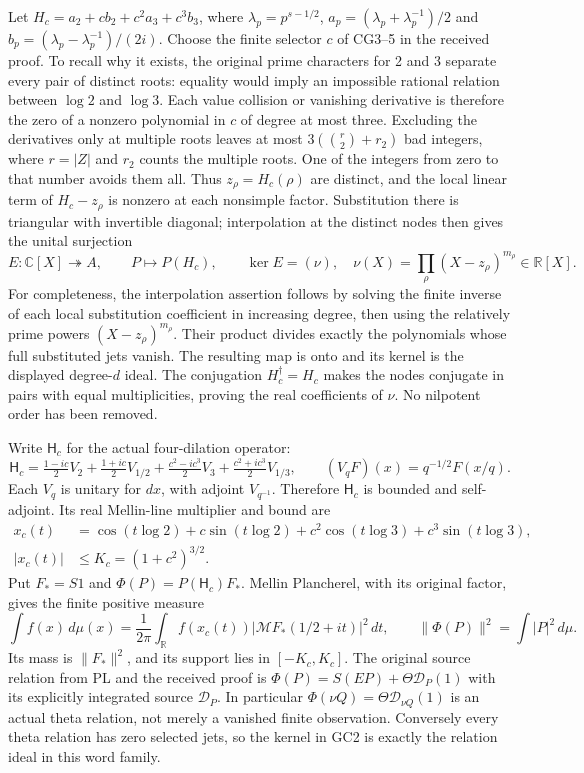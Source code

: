 \documentclass[11pt,a4paper]{article}
\theoremstyle{definition}\newtheorem{definition}[theorem]{Definition}
\newcommand{\C}{\mathbb C}\newcommand{\R}{\mathbb R}
\begin{document}
Let $H_c=a_2+c b_2+c^2a_3+c^3b_3$, where
$\lambda_p=p^{s-1/2}$, $a_p=(\lambda_p+\lambda_p^{-1})/2$ and
$b_p=(\lambda_p-\lambda_p^{-1})/(2i)$. Choose the finite selector
$c$ of CG3--5 in the received proof. To recall why it exists,
the original prime characters for 2 and 3 separate every pair of
distinct roots: equality would imply an impossible rational
relation between $\log2$ and $\log3$. Each value collision or
vanishing derivative is therefore the zero of a nonzero polynomial
in $c$ of degree at most three. Excluding the derivatives only at
multiple roots leaves at most $3(\binom r2+r_2)$ bad integers,
where $r=|Z|$ and $r_2$ counts the multiple roots. One of the
integers from zero to that number avoids them all.
Thus $z_\rho=H_c(\rho)$ are distinct, and the local linear term
of $H_c-z_\rho$ is nonzero at each nonsimple factor. Substitution
there is triangular with invertible diagonal; interpolation at
the distinct nodes then gives the unital surjection
\[
 E:\C[X]\twoheadrightarrow A,\qquad P\longmapsto P(H_c),
 \qquad \ker E=(\nu),\quad
 \nu(X)=\prod_\rho(X-z_\rho)^{m_\rho}\in\R[X].
 \tag{GC2}\label{gc:observation}
\]
For completeness, the interpolation assertion follows by solving
the finite inverse of each local substitution coefficient in
increasing degree, then using the relatively prime powers
$(X-z_\rho)^{m_\rho}$. Their product divides exactly the
polynomials whose full substituted jets vanish. The resulting
map is onto and its kernel is the displayed degree-$d$ ideal.
The conjugation $H_c^\dagger=H_c$ makes the nodes conjugate in
pairs with equal multiplicities, proving the real coefficients
of $\nu$. No nilpotent order has been removed.

Write $\mathsf H_c$ for the actual four-dilation operator:
\[
 \mathsf H_c=\tfrac{1-ic}{2}V_2+\tfrac{1+ic}{2}V_{1/2}
       +\tfrac{c^2-ic^3}{2}V_3+\tfrac{c^2+ic^3}{2}V_{1/3},
 \qquad (V_qF)(x)=q^{-1/2}F(x/q).
 \tag{GC3}\label{gc:operator}
\]
Each $V_q$ is unitary for $dx$, with adjoint $V_{q^{-1}}$.
Therefore $\mathsf H_c$ is bounded and self-adjoint. Its real
Mellin-line multiplier and bound are
\[
 \begin{aligned}
 x_c(t)&=\cos(t\log2)+c\sin(t\log2)
                +c^2\cos(t\log3)+c^3\sin(t\log3),\\
 |x_c(t)|&\le K_c=(1+c^2)^{3/2}.
 \end{aligned}
 \tag{GC4}\label{gc:symbol}
\]
Put $F_*=S1$ and $\Phi(P)=P(\mathsf H_c)F_*$. Mellin
Plancherel, with its original factor, gives the finite positive
measure
\[
 \int f(x)\,d\mu(x)=\frac1{2\pi}\int_\R
       f(x_c(t))|\mathcal MF_*(1/2+it)|^2\,dt,
 \qquad \|\Phi(P)\|^2=\int|P|^2\,d\mu.
 \tag{GC5}\label{gc:measure}
\]
Its mass is $\|F_*\|^2$, and its support lies in $[-K_c,K_c]$.
The original source relation from PL and the received proof is
$\Phi(P)=S(EP)+\Theta\mathcal D_P(1)$ with its explicitly
integrated source $\mathcal D_P$. In particular
$\Phi(\nu Q)=\Theta\mathcal D_{\nu Q}(1)$ is an actual theta
relation, not merely a vanished finite observation. Conversely
every theta relation has zero selected jets, so the kernel in
GC2 is exactly the relation ideal in this word family.
\end{document}
